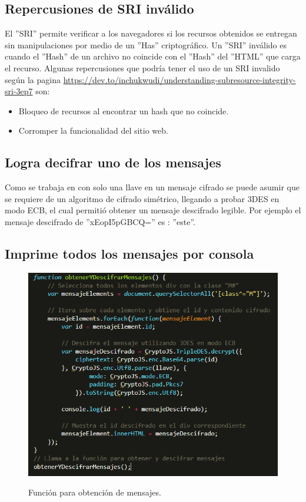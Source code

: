 \documentclass[letter,12pt]{article}
\begin{document}
\subsection{Repercusiones de SRI inválido}

El ''SRI'' permite verificar a los navegadores si los recursos obtenidos se entregan sin manipulaciones por medio de un ''Has'' criptográfico. Un ''SRI'' inválido es cuando el ''Hash'' de un archivo no coincide con el ''Hash'' del ''HTML'' que carga el recurso. Algunas repercusiones que podría tener el uso de un SRI invalido según la pagina \url{https://dev.to/inchukwudi/understanding-subresource-integrity-sri-3ep7} son:
\begin{itemize}
    \item Bloqueo de recursos al encontrar un hash que no coincide.

    \item Corromper la funcionalidad del sitio web.
\end{itemize}

\subsection{Logra decifrar uno de los mensajes}

Como se trabaja en con solo una llave en un mensaje cifrado se puede asumir que se requiere de un algoritmo de cifrado simétrico, llegando a probar 3DES en modo ECB, el cual permitió obtener un mensaje descifrado legible. Por ejemplo el mensaje descifrado de ''xEopI5pGBCQ='' es : ''este''.


\subsection{Imprime todos los mensajes por consola}

  \begin{figure}[H]
        \centering
        \includegraphics[width=15cm]{img/parte 3/4.5.png}
        \label{fig: 4.5}
        \caption{Función para obtención de mensajes.}
    \end{figure}
\end{document}
